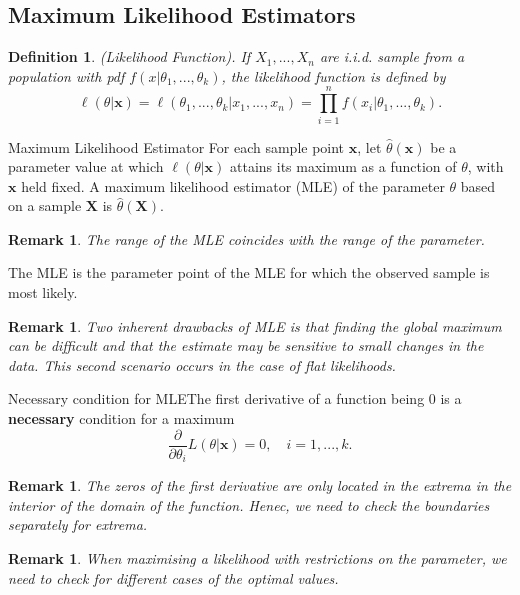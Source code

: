 \documentclass[twoside]{article}
\newtheorem{definition}[theorem]{Definition}
\newtheorem{remark}[theorem]{Remark}
\begin{document}
\subsection{Maximum Likelihood Estimators}
\begin{definition}(Likelihood Function).
If $X_1,...,X_n$ are i.i.d. sample from a population with pdf $f(x|\theta_1,...,\theta_k)$, the likelihood function is defined by
$$
\ell(\theta|\textbf{x}) = \ell(\theta_1,...,\theta_k|x_1,...,x_n) = \prod_{i=1}^{n}f(x_i|\theta_1,...,\theta_k).
$$
\end{definition}

\begin{definition_exam}{Maximum Likelihood Estimator}{} For each sample point $\textbf{x}$, let $\hat{\theta}(\textbf{x})$ be a parameter value at which $\ell(\theta|\textbf{x})$ attains its maximum as a function of $\theta$, with $\textbf{x}$ held fixed. A maximum likelihood estimator (MLE) of the parameter $\theta$ based on a sample $\textbf{X}$ is $\hat{\theta}(\textbf{X}).$
\end{definition_exam}

\begin{remark}The range of the MLE coincides with the range of the parameter.
\end{remark}

The MLE is the parameter point of the MLE for which the observed sample is most likely.

\begin{remark}Two inherent drawbacks of MLE is that finding the global maximum can be difficult and that the estimate may be sensitive to small changes in the data. This second scenario occurs in the case of flat likelihoods.
\end{remark}

\begin{proposition_exam}{Necessary condition for MLE}{}The first derivative of a function being 0 is a \textbf{necessary} condition for a maximum
$$
\frac{\partial}{\partial \theta_i}L(\theta | \textbf{x}) = 0, \quad i=1,...,k.
$$
\end{proposition_exam}

\begin{remark}The zeros of the first derivative are only located in the extrema in the interior of the domain of the function. Henec, we need to check the boundaries separately for extrema.
\end{remark}

\begin{remark}When maximising a likelihood with restrictions on the parameter, we need to check for different cases of the optimal values.
\end{remark}
\end{document}
